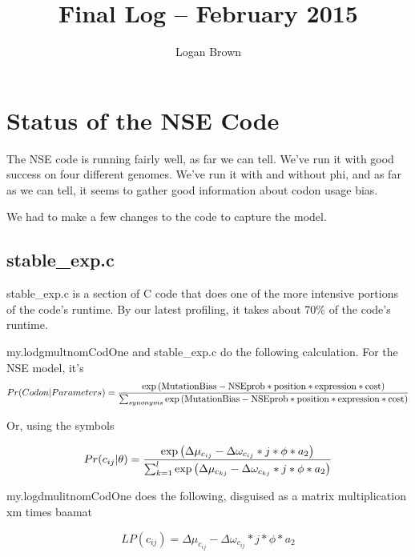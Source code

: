 

\title{Final Log -- February 2015}
\author{Logan Brown}


\maketitle
\tableofcontents

\newpage


\section{Status of the NSE Code}

The NSE code is running fairly well, as far we can tell. We've run it with good success on four different genomes. We've run it with and without phi, and as far as we can tell, it seems to gather good information about codon usage bias.

We had to make a few changes to the code to capture the model. 

\subsection{stable\_exp.c}

stable\_exp.c is a section of C code that does one of the more intensive portions of the code's runtime. By our latest profiling, it takes about 70\% of the code's runtime.

my.lodgmultnomCodOne and stable\_exp.c do the following calculation. For the NSE model, it's 
$$
Pr(Codon | Parameters) =
\frac{\hbox{exp}\left( \hbox{MutationBias} - \hbox{NSEprob} * \hbox{position} * \hbox{expression} * \hbox{cost}\right)}
{\sum_{synonyms} \hbox{exp}\left( \hbox{MutationBias} - \hbox{NSEprob} * \hbox{position} * \hbox{expression} * \hbox{cost}\right)}
$$

Or, using the symbols

$$
Pr(c_{ij} | \theta) = 
\frac{\hbox{exp}\left( \Delta\mu_{c_{ij}} - \Delta \omega_{c_{ij}} * j * \phi * a_2\right)}
{\sum_{k=1}^l \hbox{exp}\left( \Delta\mu_{c_{kj}} - \Delta \omega_{c_{kj}} * j * \phi * a_2\right)}
$$

my.logdmulitnomCodOne does the following, disguised as a matrix multiplication xm times baamat 

$$LP(c_{ij}) = \Delta\mu_{c_{ij}} - \Delta \omega_{c_{ij}} * j * \phi * a_2$$

